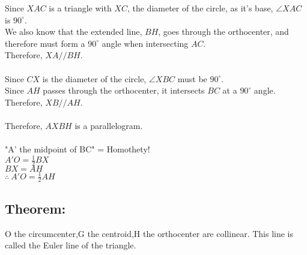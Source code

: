 \documentclass{article}
\begin{document}
Since $XAC$ is a triangle with $XC$, the diameter of the circle, as it's base, $\angle XAC$ is $90^\circ$.\\
We also know that the extended line, $BH$, goes through the orthocenter, and therefore must form a $90^\circ$ angle when intersecting $AC$.\\
Therefore, $XA//BH$.\\\\
Since $CX$ is the diameter of the circle, $\angle XBC$ must be $90^\circ$.\\
Since $AH$ passes through the orthocenter, it intersects $BC$ at a $90^\circ$ angle.\\
Therefore, $XB//AH$.\\\\
Therefore, $AXBH$ is a parallelogram.\\\\
"A' the midpoint of BC" = Homothety!\\
$A'O=\frac{1}{2} BX$\\
$BX=AH$\\
$\therefore \ A'O=\frac{1}{2} AH$


\pagebreak
\subsection{Theorem:}
O the circumcenter,G the centroid,H the orthocenter are collinear. This line is called the Euler line of the triangle.



\end{document}
